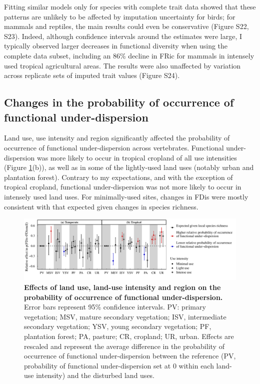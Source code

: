 Fitting similar models only for species with complete trait data showed that these patterns are unlikely to be affected by imputation uncertainty for birds; for mammals and reptiles, the main results could even be conservative (Figure S22, S23). Indeed, although confidence intervals around the estimates were large, I typically observed larger decreases in functional diversity when using the complete data subset, including an 86\% decline in FRic for mammals in intensely used tropical agricultural areas. The results were also unaffected by variation across replicate sets of imputed trait values (Figure S24).

\clearpage

\subsection{Changes in the probability of occurrence of functional under-dispersion}

Land use, use intensity and region significantly affected the probability of occurrence of functional under-dispersion across vertebrates. Functional under-dispersion was more likely to occur in tropical cropland of all use intensities (Figure \ref{chap3_fig4}(b)), as well as in some of the lightly-used land uses (notably urban and plantation forest). Contrary to my expectations, and with the exception of tropical cropland, functional under-dispersion was not more likely to occur in intensely used land uses. For minimally-used sites, changes in FDis were mostly consistent with that expected given changes in species richness.

\begin{figure}[h!]
\centering
\includegraphics[scale=0.75]{figures/Chapter_FD/Figure4}
\caption[Effects of land use, land-use intensity and region on the probability of occurrence of functional under-dispersion.]{\textbf{Effects of land use, land-use intensity and region on the probability of occurrence of functional under-dispersion.} Error bars represent 95\% confidence intervals. PV: primary vegetation; MSV, mature secondary vegetation; ISV, intermediate secondary vegetation; YSV, young secondary vegetation; PF, plantation forest; PA, pasture; CR, cropland; UR, urban. Effects are rescaled and represent the average difference in the probability of occurrence of functional under-dispersion between the reference (PV, probability of functional under-dispersion set at 0 within each land-use intensity) and the disturbed land uses.}
\label{chap3_fig4}
\end{figure}

